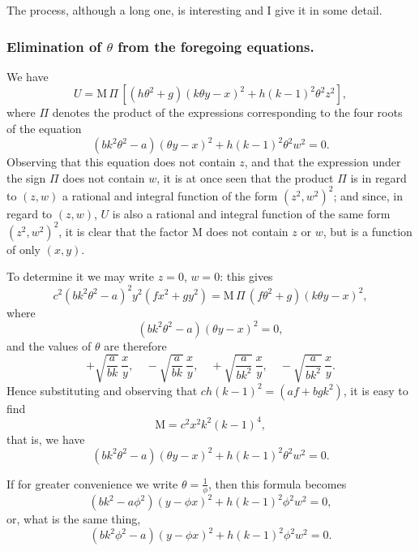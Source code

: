 \documentclass[11pt,a4paper]{book}
\begin{document}
The process, although a long one, is interesting and I give it in some detail.

\subsubsection*{Elimination of $\theta$ from the foregoing equations.}

We have
\[
U = \text{M}\,\Pi\,[(h\theta^{2} + g)(k\theta y - x)^{2} + h(k-1)^{2}\theta^{2}z^{2}],
\]
where $\Pi$ denotes the product of the expressions corresponding to the four roots of the equation
\[
(bk^{2}\theta^{2} - a)(\theta y - x)^{2} + h(k-1)^{2}\theta^{2}w^{2} = 0.
\]
Observing that this equation does not contain $z$, and that the expression under the sign $\Pi$ does not contain $w$, it is at once seen that the product $\Pi$ is in regard to $(z, w)$ a rational and integral function of the form $(z^{2}, w^{2})^{2}$; and since, in regard to $(z, w)$, $U$ is also a rational and integral function of the same form $(z^{2}, w^{2})^{2}$, it is clear that the factor M does not contain $z$ or $w$, but is a function of only $(x, y)$.

To determine it we may write $z=0$, $w=0$: this gives
\[
c^{2}(bk^{2}\theta^{2} - a)^{2}y^{2}(fx^{2} + gy^{2}) = \text{M}\,\Pi\,(f\theta^{2} + g)(k\theta y - x)^{2},
\]
where
\[
(bk^{2}\theta^{2} - a)(\theta y - x)^{2} = 0,
\]
and the values of $\theta$ are therefore
\[
+\sqrt{\frac{a}{bk}}\,\frac{x}{y}, \quad -\sqrt{\frac{a}{bk}}\,\frac{x}{y}, \quad +\sqrt{\frac{a}{bk^{2}}}\,\frac{x}{y}, \quad -\sqrt{\frac{a}{bk^{2}}}\,\frac{x}{y}.
\]
Hence substituting and observing that $ch(k-1)^{2} = (af + bgk^{2})$, it is easy to find
\[
\text{M} = c^{2}x^{2}k^{2}(k-1)^{4},
\]
that is, we have
\[
(bk^{2}\theta^{2} - a)(\theta y - x)^{2} + h(k-1)^{2}\theta^{2}w^{2} = 0.
\]

\newpage
\setcounter{page}{106}

If for greater convenience we write $\theta = \tfrac{1}{\phi}$, then this formula becomes
\[
(bk^{2} - a\phi^{2})(y - \phi x)^{2} + h(k-1)^{2}\phi^{2}w^{2} = 0,
\]
or, what is the same thing,
\[
(bk^{2}\phi^{2} - a)(y - \phi x)^{2} + h(k-1)^{2}\phi^{2}w^{2} = 0.
\]
\end{document}

